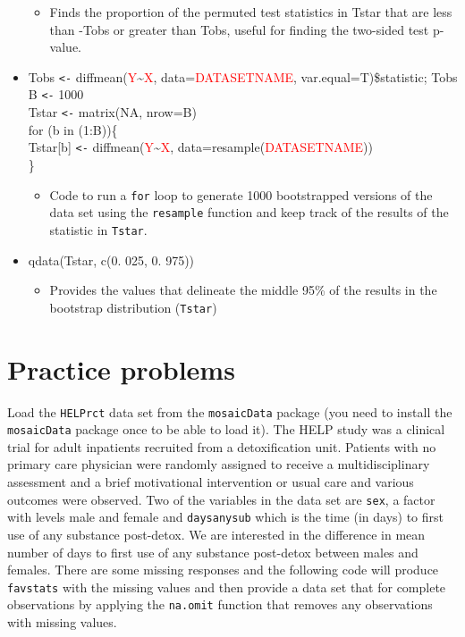\documentclass[]{book}
\providecommand{\tightlist}{%
  \setlength{\itemsep}{0pt}\setlength{\parskip}{0pt}}
\theoremstyle{definition}
\theoremstyle{definition}
\theoremstyle{remark}
\begin{document}
\begin{itemize}
  \begin{itemize}
  \tightlist
  \item
    Finds the proportion of the permuted test statistics in Tstar that
    are less than -\textbar{}Tobs\textbar{} or greater than
    \textbar{}Tobs\textbar{}, useful for finding the two-sided test
    p-value.
  \end{itemize}
\item
  Tobs \texttt{\textless{}-}
  diffmean(\textcolor{red}{Y}\textasciitilde{}\textcolor{red}{X},
  data=\textcolor{red}{DATASETNAME}, var.equal=T)\$statistic; Tobs\\
  B \texttt{\textless{}-} 1000\\
  Tstar \texttt{\textless{}-} matrix(NA, nrow=B)\\
  for (b in (1:B))\{\\
  Tstar{[}b{]} \texttt{\textless{}-}
  diffmean(\textcolor{red}{Y}\textasciitilde{}\textcolor{red}{X},
  data=resample(\textcolor{red}{DATASETNAME}))\\
  \}

  \begin{itemize}
  \tightlist
  \item
    Code to run a \texttt{for} loop to generate 1000 bootstrapped
    versions of the data set using the \texttt{resample} function and
    keep track of the results of the statistic in \texttt{Tstar}.
  \end{itemize}
\item
  qdata(Tstar, c(0. 025, 0. 975))

  \begin{itemize}
  \tightlist
  \item
    Provides the values that delineate the middle 95\% of the results in
    the bootstrap distribution (\texttt{Tstar})
  \end{itemize}
\end{itemize}

\section{Practice problems}\label{section2-12}

Load the \texttt{HELPrct} data set from the \texttt{mosaicData} package
\citep{R-mosaicData} (you need to install the \texttt{mosaicData}
package once to be able to load it). The HELP study was a clinical trial
for adult inpatients recruited from a detoxification unit. Patients with
no primary care physician were randomly assigned to receive a
multidisciplinary assessment and a brief motivational intervention or
usual care and various outcomes were observed. Two of the variables in
the data set are \texttt{sex}, a factor with levels male and female and
\texttt{daysanysub} which is the time (in days) to first use of any
substance post-detox. We are interested in the difference in mean number
of days to first use of any substance post-detox between males and
females. There are some missing responses and the following code will
produce \texttt{favstats} with the missing values and then provide a
data set that for complete observations by applying the \texttt{na.omit}
function that removes any observations with missing values.
\end{document}
